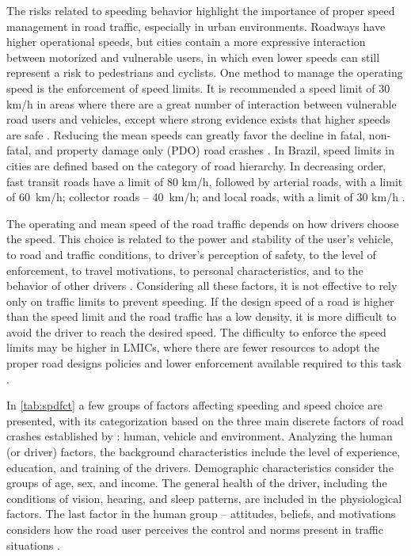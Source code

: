 The risks related to speeding behavior highlight the importance of proper speed management in road traffic, especially in urban environments. Roadways have higher operational speeds, but cities contain a more expressive interaction between motorized and vulnerable users, in which even lower speeds can still represent a risk to pedestrians and cyclists. One method to manage the operating speed is the enforcement of speed limits. It is recommended a speed limit of 30 km/h in areas where there are a great number of interaction between vulnerable road users and vehicles, except where strong evidence exists that higher speeds are safe \cite{WHO2020,whoGlobalPlanDecade2021}. Reducing the mean speeds can greatly favor the decline in fatal, non-fatal, and property damage only (PDO) road crashes \cite{Elvik2013}. In Brazil, speed limits in cities are defined based on the category of road hierarchy. In decreasing order, fast transit roads have a limit of 80 km/h, followed by arterial roads, with a limit of 60 km/h; collector roads – 40 km/h; and local roads, with a limit of 30 km/h \cite{Brasil1997}.

The operating and mean speed of the road traffic depends on how drivers choose the speed. This choice is related to the power and stability of the user's vehicle, to road and traffic conditions, to driver's perception of safety, to the level of enforcement, to travel motivations, to personal characteristics, and to the behavior of other drivers \cite{Mohan2016a, Shinar2017}. Considering all these factors, it is not effective to rely only on traffic limits to prevent speeding. If the design speed of a road is higher than the speed limit and the road traffic has a low density, it is more difficult to avoid the driver to reach the desired speed. The difficulty to enforce the speed limits may be higher in LMICs, where there are fewer resources to adopt the proper road designs policies and lower enforcement available required to this task \cite{Mohan2016a}. 

In \autoref{tab:spdfct} a few groups of factors affecting speeding and speed choice are presented, with its categorization based on the three main discrete factors of road crashes established by \textcite{Haddon1980}: human, vehicle and environment. Analyzing the human (or driver) factors, the background characteristics include the level of experience, education, and training of the drivers. Demographic characteristics consider the groups of age, sex, and income. The general health of the driver, including the conditions of vision, hearing, and sleep patterns, are included in the physiological factors. The last factor in the human group – attitudes, beliefs, and motivations considers how the road user perceives the control and norms present in traffic situations \cite{Richard2013a}.  

